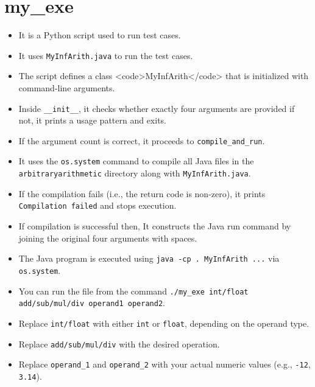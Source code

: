 \documentclass{article}
\begin{document}
\section*{my\_exe}
\begin{itemize}
    \item It is a Python script used to run test cases.
    \item It uses \texttt{MyInfArith.java} to run the test cases.
    \item The script defines a class <code>MyInfArith</code> that is initialized with command-line arguments.
    \item Inside \texttt{\_\_init\_\_}, it checks whether exactly four arguments are provided if not, it prints a usage pattern and exits.
    \item If the argument count is correct, it proceeds to \texttt{compile\_and\_run}.
    \item It uses the \texttt{os.system} command to compile all Java files in the \texttt{arbitraryarithmetic} directory along with \texttt{MyInfArith.java}.
    \item If the compilation fails (i.e., the return code is non-zero), it prints \texttt{Compilation failed} and stops execution.
    \item If compilation is successful then, It constructs the Java run command by joining the original four arguments with spaces.
    \item The Java program is executed using \texttt{java -cp . MyInfArith ...} via \texttt{os.system}.
    \item You can run the file from the command \texttt{./my\_exe int/float add/sub/mul/div operand1 operand2}.
    \item Replace \texttt{int/float} with either \texttt{int} or \texttt{float}, depending on the operand type.
    \item Replace \texttt{add/sub/mul/div} with the desired operation.
    \item Replace \texttt{operand\_1} and \texttt{operand\_2} with your actual numeric values (e.g., \texttt{-12}, \texttt{3.14}).
\end{itemize}
\end{document}
